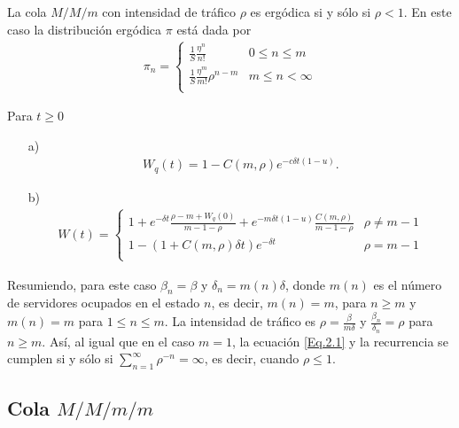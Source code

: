 \begin{Prop}
La cola $M/M/m$ con intensidad de tr\'afico $\rho$ es erg\'odica si y s\'olo si $\rho<1$. En este caso la distribuci\'on erg\'odica $\pi$ est\'a dada por
\begin{eqnarray}
\pi_{n}=\left\{\begin{array}{cc}
\frac{1}{S}\frac{\eta^{n}}{n!} & 0\leq n\leq m\\
\frac{1}{S}\frac{\eta^{m}}{m!}\rho^{n-m} & m\leq n<\infty\\
\end{array}\right.
\end{eqnarray}
\end{Prop}

\begin{Prop}
Para $t\geq0$
\begin{itemize}
\item[a)]
\begin{eqnarray}
W_{q}\left(t\right)=1-C\left(m,\rho\right)e^{-c\delta
t\left(1-u\right)}.
\end{eqnarray} 
\item[b)]\begin{eqnarray}
W\left(t\right)=\left\{\begin{array}{cc}
1+e^{-\delta t}\frac{\rho-m+W_{q}\left(0\right)}{m-1-\rho}+e^{-m\delta t\left(1-u\right)}\frac{C\left(m,\rho\right)}{m-1-\rho} & \rho\neq m-1\\
1-\left(1+C\left(m,\rho\right)\delta t\right)e^{-\delta t} & \rho=m-1\\
\end{array}\right.
\end{eqnarray}
\end{itemize}
\end{Prop}

Resumiendo, para este caso $\beta_{n}=\beta$ y
$\delta_{n}=m\left(n\right)\delta$, donde $m\left(n\right)$ es el n\'umero de servidores ocupados en el estado $n$, es decir,
$m\left(n\right)=m$, para $n\geq m$ y $m\left(n\right)=m$ para
$1\leq n\leq m$. La intensidad de tr\'afico es
$\rho=\frac{\beta}{m\delta}$ y $\frac{\beta_{n}}{\delta_{n}}=\rho$
para $n\geq m$. As\'i, al igual que en el caso $m=1$, la ecuaci\'on
\ref{Eq.2.1} y la recurrencia se cumplen si y s\'olo si
$\sum_{n=1}^{\infty}\rho^{-n}=\infty$, es decir, cuando
$\rho\leq1$. 


%
\subsection{Cola $M/M/m/m$}
%

